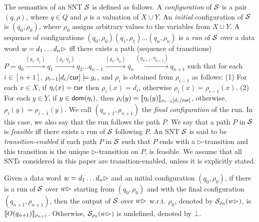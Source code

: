 The semantics of an SNT ${\mathcal{S} }$  is defined as follows. A \emph{configuration} of ${\mathcal{S} }$ is a pair $(q,\rho)$, where $q \in Q$ and $\rho$ is a valuation of $X \cup Y$. An \emph{initial} configuration of ${\mathcal{S} }$ is $(q_0,\rho_0)$, where $\rho_0$ assigns arbitrary values to the variables from $X\cup Y$.
A sequence of configurations $(q_0,\rho_0)(q_1,\rho_1)\ldots(q_n,\rho_n)$ is
a \emph{run} of ${\mathcal{S} }$ over a data word $w=d_1 \dots d_n \rhd$ iff there exists a path (sequence of transitions) $P=q_0 \xrightarrow{(g_1,\eta_1)} q_1 \xrightarrow{(g_2,\eta_2)} q_2 \dots q_{n-1} \xrightarrow{(g_n, \eta_n)} q_n \xrightarrow{(g_{n+1}, \eta_{n+1})} q_{n+1}$ such that for each $i \in [n+1]$, $\rho_{i-1}[d_i/\mathsf{cur}] \models g_i$, and $\rho_i$ is obtained from $\rho_{i-1}$ as follows: (1) For each $x \in X$, if $\eta_i(x)=\mathsf{cur}$ then $\rho_i(x)=d_i$,  otherwise $\rho_i(x)=\rho_{i-1}(x)$. (2) For each $y \in Y$, if $y \in \mathsf{dom}(\eta_i)$, then $\rho_i(y)=\llbracket\eta_i(y)\rrbracket_{\rho_{i-1}[d_i/\mathsf{cur}]}$, otherwise, $\rho_i(y)=\rho_{i-1}(y)$.
We call $(q_{n+1},\rho_{n+1})$ the \emph{final configuration} of the run. In this case, we also say that the run follows the path $P$.
We say that a path $P$ in ${\mathcal{S} }$ is \emph{feasible} iff there exists a run of ${\mathcal{S} }$ following $P$. 
An SNT ${\mathcal{S} }$ is said to be \emph{transition-enabled} if each path $P$ in ${\mathcal{S} }$ such that $P$ ends with a $\triangleright$-transition and this transition is the unique $\triangleright$-transition on $P$,  is feasible. We assume that all SNTs considered in this paper are transition-enabled, unless it is explicitly stated.


Given a data word $w = d_1 \dots d_n\rhd$ and an initial configuration $(q_0, \rho_0)$, if there is a run of ${\mathcal{S} }$ over $w\rhd$ starting from $(q_0,\rho_0)$ and with the final configuration $(q_{n+1},\rho_{n+1})$, then the output of ${\mathcal{S} }$ over $w\rhd$ w.r.t. $\rho_0$, denoted by ${{\mathcal{S} }}_{\rho_0}(w\rhd)$, is $\llbracket O(q_{n+1})\rrbracket_{\rho_{n+1}}$. Otherwise, ${{\mathcal{S} }}_{\rho_0}(w\rhd)$ is undefined, denoted by $\bot$. 



